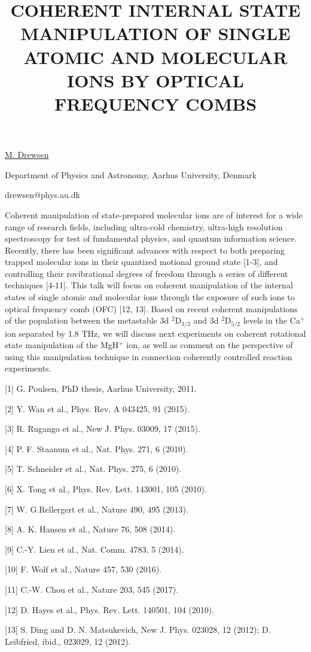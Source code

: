 \title{COHERENT INTERNAL STATE MANIPULATION OF SINGLE ATOMIC AND MOLECULAR IONS BY OPTICAL FREQUENCY COMBS}

\underline{M. Drewsen} 

{\normalsize{\vspace{-4mm}
Department of Physics and Astronomy, Aarhus University, Denmark

\email drewsen@phys.au.dk}}

Coherent manipulation of state-prepared molecular ions are of interest for a wide range of research fields, including ultra-cold chemistry, ultra-high resolution spectroscopy for test of fundamental physics, and quantum information science. Recently, there has been significant advances with respect to both preparing trapped molecular ions in their quantized motional ground state [1-3], and controlling their rovibrational degrees of freedom through a series of different techniques [4-11]. This talk will focus on coherent manipulation of the internal states of single atomic and molecular ions through the exposure of such ions to optical frequency comb (OFC) [12, 13]. Based on recent coherent manipulations of the population between the metastable 3d $^2\text{D}_{3/2}$ and 3d $^2\text{D}_{5/2}$ levels in the Ca$^+$ ion separated by 1.8 THz, we will discuss next experiments on coherent rotational state manipulation of the MgH$^+$ ion, as well as comment on the perspective of using this manipulation technique in connection coherently controlled reaction experiments.

{\normalsize
[1] G. Poulsen, PhD thesis, Aarhus University, 2011.
\vsp

[2] Y. Wan et al., Phys. Rev. A 043425, 91 (2015).
\vsp

[3] R. Rugango et al., New J. Phys. 03009, 17 (2015).
\vsp

[4] P. F. Staanum et al., Nat. Phys. 271, 6 (2010).
\vsp

[5] T. Schneider et al., Nat. Phys. 275, 6 (2010).
\vsp

[6] X. Tong et al., Phys. Rev. Lett. 143001, 105 (2010).
\vsp

[7] W. G.Rellergert et al., Nature 490, 495 (2013).
\vsp

[8] A. K. Hansen et al., Nature 76, 508 (2014).
\vsp

[9] C.-Y. Lien et al., Nat. Comm. 4783, 5 (2014).
\vsp

[10] F. Wolf et al., Nature 457, 530 (2016).
\vsp

[11] C.-W. Chou et al., Nature 203, 545 (2017).
\vsp

[12] D. Hayes et al., Phys. Rev. Lett. 140501, 104 (2010).
\vsp

[13] S. Ding and D. N. Matsukevich, New J. Phys. 023028, 12 (2012); D. Leibfried, ibid., 023029, 12 (2012).
}

\vspace{\baselineskip} 